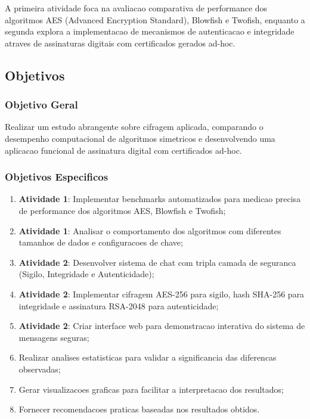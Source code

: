 \documentclass[12pt,a4paper,oneside]{article}
\begin{document}
A primeira atividade foca na avaliacao comparativa de performance dos algoritmos AES (Advanced Encryption Standard), Blowfish e Twofish, enquanto a segunda explora a implementacao de mecanismos de autenticacao e integridade atraves de assinaturas digitais com certificados gerados ad-hoc.

\subsection{Objetivos}

\subsubsection{Objetivo Geral}

Realizar um estudo abrangente sobre cifragem aplicada, comparando o desempenho computacional de algoritmos simetricos e desenvolvendo uma aplicacao funcional de assinatura digital com certificados ad-hoc.

\subsubsection{Objetivos Especificos}

\begin{enumerate}
    \item \textbf{Atividade 1}: Implementar benchmarks automatizados para medicao precisa de performance dos algoritmos AES, Blowfish e Twofish;
    \item \textbf{Atividade 1}: Analisar o comportamento dos algoritmos com diferentes tamanhos de dados e configuracoes de chave;
    \item \textbf{Atividade 2}: Desenvolver sistema de chat com tripla camada de seguranca (Sigilo, Integridade e Autenticidade);
    \item \textbf{Atividade 2}: Implementar cifragem AES-256 para sigilo, hash SHA-256 para integridade e assinatura RSA-2048 para autenticidade;
    \item \textbf{Atividade 2}: Criar interface web para demonstracao interativa do sistema de mensagens seguras;
    \item Realizar analises estatisticas para validar a significancia das diferencas observadas;
    \item Gerar visualizacoes graficas para facilitar a interpretacao dos resultados;
    \item Fornecer recomendacoes praticas baseadas nos resultados obtidos.
\end{enumerate}
\end{document}
